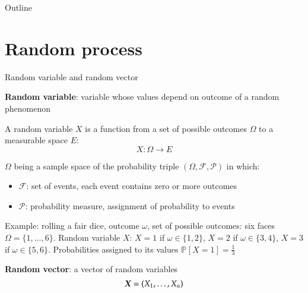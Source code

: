 \documentclass[9pt]{beamer}
\newcommand{\Prob}[2]{\mathbb{P}_{#1}\left[ #2 \right]}
\begin{document}
\begin{frame}{Outline}
  \tableofcontents[sectionstyle=show/show, subsectionstyle=show/show/show]
\end{frame}

\section{Random process}

\begin{frame}[t]{Random variable and random vector}

{\bf Random variable}: variable whose values depend on outcome of a random phenomenon

A random variable $X$ is a function from a set of possible outcomes $\Omega$ to a measurable space $E$:
\[
X : \Omega \to E
\]

$\Omega$ being a sample space of the probability triple $(\Omega, \mathcal{F}, \mathcal{P})$  in which:
\begin{itemize}
\item $\mathcal{F}$: set of events, each event contains zero or more outcomes
\item $\mathcal{P}$: probability measure, assignment of probability to events
\end{itemize}



Example: rolling a fair dice, outcome $\omega$, set of possible outcomes: six faces $\Omega= \{ 1, \dots, 6 \}$. Random variable $X$: $X = 1$ if $\omega \in \{ 1, 2 \}$, $X = 2$ if $\omega \in \{ 3, 4 \}$, $X = 3$ if $\omega \in \{ 5, 6 \}$. Probabilities assigned to its values $\Prob{}{X=1} = \frac{1}{3}$

{\bf Random vector}: a vector of random variables
\[
\boldsymbol X=(X_1,\dots,X_n)
\]

\end{frame}
\end{document}
